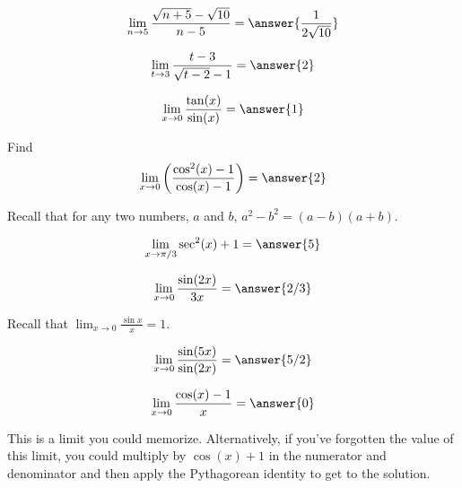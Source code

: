 \documentclass[handout]{ximera}
\begin{document}
\begin{exercise}
\[
\lim_{n\to 5 } \frac{\sqrt{n+5}-\sqrt{10}}{n-5} = \answer{\frac{1}{2 \sqrt{10}}}
\]
\end{exercise}


\begin{exercise}
\[
\lim_{t\to 3 } \frac{t-3}{\sqrt{t-2}-1} = \answer{2}
\]
\end{exercise}

\begin{exercise}
\[\lim_{x \to 0} \frac{\tan(x)}{\sin(x)} = \answer{1}\]
\end{exercise}

\begin{exercise}
Find
\[
\lim_{x\to0}\left(\frac{\cos^{2}(x)-1}{\cos(x)-1}\right)
= \answer{2}
\]

\begin{hint}
Recall that for any two numbers, $a$ and $b$,  $a^2-b^2=(a-b)(a+b)$.
\end{hint}

\end{exercise}


\begin{exercise}
\[\lim_{x \to \pi/3} \sec^2(x)+1 = \answer{5}\]
\end{exercise}

\begin{exercise}
\[\lim_{x \to 0} \frac{\sin(2x)}{3x} = \answer{2/3}\]
\begin{hint}
Recall that $\displaystyle\lim_{x \to 0} \frac{\sin x}{x} = 1$.
\end{hint}
\end{exercise}

\begin{exercise}
\[\lim_{x \to 0} \frac{\sin(5x)}{\sin(2x)} = \answer{5/2}\]
\end{exercise}

\begin{exercise}
\[\lim_{x \to 0} \frac{\cos(x)-1}{x} = \answer{0}\]

\begin{hint}
This is a limit you could memorize.  Alternatively, if you've forgotten the value of this limit, you could multiply by $\cos(x)+1$ in the numerator and denominator and then apply the Pythagorean identity to get to the solution.
\end{hint}

\end{exercise}
\end{document}
